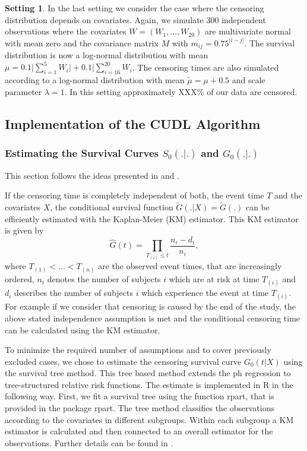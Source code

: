 \documentclass[12pt, a4paper]{article}
\theoremstyle{definition}
\newtheorem{setting}{Setting}
\theoremstyle{plain}
\numberwithin{equation}{section}
\numberwithin{figure}{section}
\numberwithin{table}{section}
\begin{document}
	\begin{setting}
		In the last setting we consider the case where the censoring distribution depends on covariates.
		Again, we simulate 300 independent observations where the covariates $W=(W_1,\dots,W_{20})$ are multivariate normal with mean zero and the covariance matrix $M$ with $m_{ij}=0.75^{\vert i-j\vert}$.
		The survival distribution is now a log-normal distribution with mean $\mu = 0.1 \vert \sum_{i=1}^5 W_i \vert + 0.1 \vert \sum_{i=16}^{20}W_i$.
		The censoring times are also simulated according to a log-normal distribution with mean $\tilde{\mu}=\mu+0.5$ and scale parameter $\lambda = 1$.
		In this setting approximately XXX\% of our data are censored.
	\end{setting}
			
	\subsection{Implementation of the CUDL Algorithm}
		
	\subsubsection{Estimating the Survival Curves $S_0(.\vert.)$ and $G_0(.\vert.)$}
	This section follows the ideas presented in \citet*{drcut} and \citet*{drtrees}.
	
	If the censoring time is completely independent of both, the event time $T$ and the covariates $X$, the conditional survival function $\tilde{G}(.\vert X)=\tilde{G}(.)$ can be efficiently estimated with the Kaplan-Meier (KM) estimator.
	This KM estimator is given by
	\begin{equation*}
		\hat{G}(t) = \prod_{T_{(i)}\leq t} \frac{n_i-d_i}{n_i},
	\end{equation*}
	where $T_{(1)}<\dots<T_{(n)}$ are the observed event times, that are increasingly ordered, $n_i$ denotes the number of subjects $i$ which are at risk at time $T_{(i)}$ and $d_i$ describes the number of subjects $i$ which experience the event at time $T_{(i)}$.
	For example if we consider that censoring is caused by the end of the study, the above stated independence assumption is met and the conditional censoring time can be calculated using the KM estimator.
	
	To minimize the required number of assumptions and to cover previously excluded cases, we chose to estimate the censoring survival curve $G_0(t \vert X)$ using the survival tree method.
	This tree based method extends the ph regression to tree-structured relative risk functions.
	The estimate is implemented in R in the following way.
	First, we fit a survival tree using the function rpart, that is provided in the package rpart.
	The tree method classifies the observations according to the covariates in different subgroups.
	Within each subgroup a KM estimator is calculated and then connected to an overall estimator for the observations. %
	Further details can be found in \citet*{relativerisktrees}.
	
\end{document}
